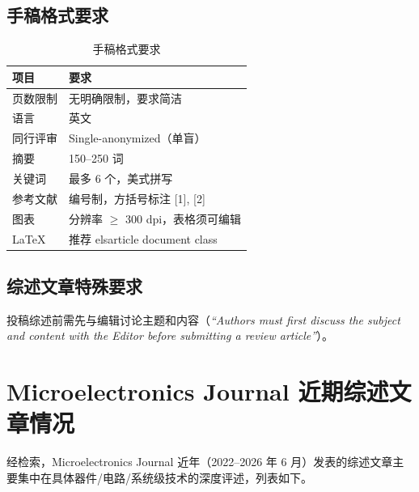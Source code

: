 \documentclass[11pt,a4paper]{article}
\begin{document}
\subsection{手稿格式要求}
\begin{table}[!htbp]
\centering
\small
\begin{tabular}{ll}
\toprule
\textbf{项目} & \textbf{要求} \\
\midrule
页数限制 & 无明确限制，要求简洁 \\
语言 & 英文 \\
同行评审 & Single-anonymized（单盲） \\
摘要 & 150--250 词 \\
关键词 & 最多 6 个，美式拼写 \\
参考文献 & 编号制，方括号标注 {[}1{]}, {[}2{]} \\
图表 & 分辨率 $\geq$ 300 dpi，表格须可编辑 \\
LaTeX & 推荐 elsarticle document class \\
\bottomrule
\end{tabular}
\caption{手稿格式要求}
\end{table}

\subsection{综述文章特殊要求}
\small
投稿综述前需先与编辑讨论主题和内容（\textit{``Authors must first discuss the subject and content with the Editor before submitting a review article''}）。

\section{Microelectronics Journal 近期综述文章情况}

\small
经检索，Microelectronics Journal 近年（2022--2026 年 6 月）发表的综述文章主要集中在具体器件/电路/系统级技术的深度评述，列表如下。
\end{document}
